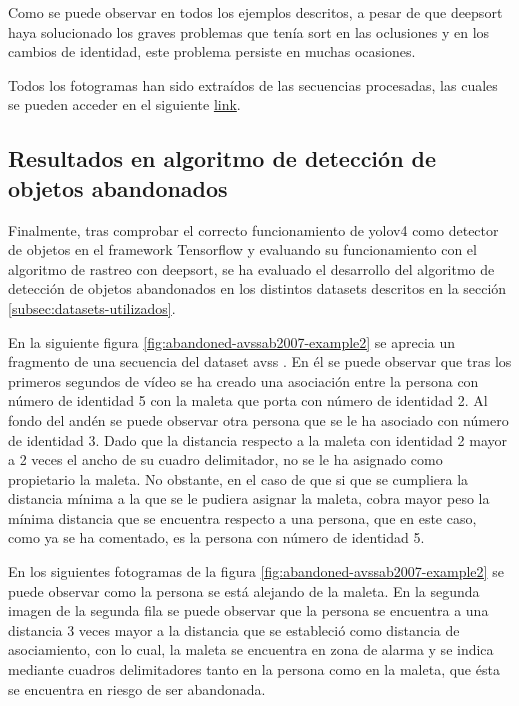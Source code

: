 Como se puede observar en todos los ejemplos descritos, a pesar de que \gls{deepsort} haya solucionado los graves problemas que tenía \gls{sort} en las oclusiones y en los cambios de identidad, este problema persiste en muchas ocasiones.

Todos los fotogramas han sido extraídos de las secuencias procesadas, las cuales se pueden acceder en el siguiente \href{https://drive.google.com/drive/folders/1MIfUcVmwIot6QgV0VRRu5PdFscV1Ma48?usp=sharing}{link}.

\subsection{Resultados en algoritmo de detección de objetos abandonados}
\label{subsec:resultados-abandon-algorithm}

Finalmente, tras comprobar el correcto funcionamiento de \gls{yolov4} como detector de objetos en el framework Tensorflow y evaluando su funcionamiento con el algoritmo de rastreo con \gls{deepsort}, se ha evaluado el desarrollo del algoritmo de detección de objetos abandonados en los distintos datasets descritos en la sección \ref{subsec:datasets-utilizados}.

En la siguiente figura \ref{fig:abandoned-avssab2007-example2} se aprecia un fragmento de una secuencia del dataset \gls{avss} \cite{AVSSAB2007-dataset}. En él se puede observar que tras los primeros segundos de vídeo se ha creado una asociación entre la persona con número de identidad 5 con la maleta que porta con número de identidad 2. Al fondo del andén se puede observar otra persona que se le ha asociado con número de identidad 3. Dado que la distancia respecto a la maleta con identidad 2 mayor a 2 veces el ancho de su cuadro delimitador, no se le ha asignado como propietario la maleta. No obstante, en el caso de que si que se cumpliera la distancia mínima a la que se le pudiera asignar la maleta, cobra mayor peso la mínima distancia que se encuentra respecto a una persona, que en este caso, como ya se ha comentado, es la persona con número de identidad 5.

En los siguientes fotogramas de la figura \ref{fig:abandoned-avssab2007-example2} se puede observar como la persona se está alejando de la maleta. En la segunda imagen de la segunda fila se puede observar que la persona se encuentra a una distancia 3 veces mayor a la distancia que se estableció como distancia de asociamiento, con lo cual, la maleta se encuentra en zona de alarma y se indica mediante cuadros delimitadores tanto en la persona como en la maleta, que ésta se encuentra en riesgo de ser abandonada.

